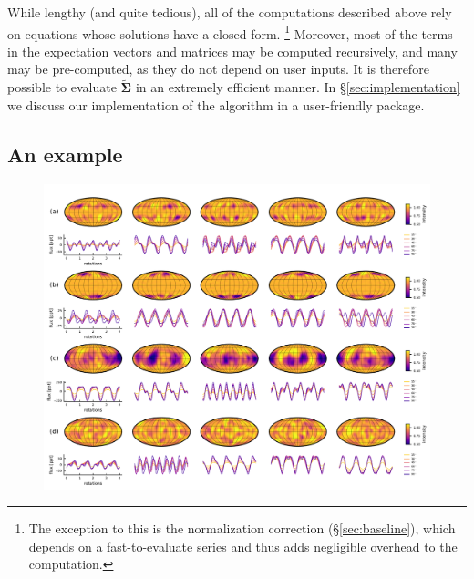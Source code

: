 \documentclass[modern]{aastex62}
\begin{document}
While lengthy (and quite tedious), all of the computations described above rely
on equations whose solutions have a closed form.%
%
\footnote{The exception to this is the
    normalization correction (\S\ref{sec:baseline}), which depends on a
    fast-to-evaluate series and thus adds negligible overhead to the computation.}
%
Moreover, most of the terms in the expectation vectors and matrices may
be computed recursively, and many may be pre-computed, as they do not
depend on user inputs.
%
It is therefore possible to evaluate $\tilde{\pmb{\Sigma}}$ in an extremely
efficient manner. In \S\ref{sec:implementation} we discuss our
implementation of the algorithm in a user-friendly \Python package.

\subsection{An example}
\label{sec:examples}

\begin{figure}[t!]
    \begin{centering}
        \includegraphics[width=\linewidth]{figures/samples.pdf}
    \end{centering}
\end{figure}
\end{document}
